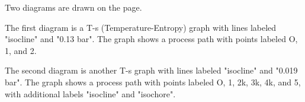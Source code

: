 Two diagrams are drawn on the page. 

The first diagram is a T-s (Temperature-Entropy) graph with lines labeled "isocline" and "0.13 bar". The graph shows a process path with points labeled O, 1, and 2.

The second diagram is another T-s graph with lines labeled "isocline" and "0.019 bar". The graph shows a process path with points labeled O, 1, 2k, 3k, 4k, and 5, with additional labels "isocline" and "isochore".